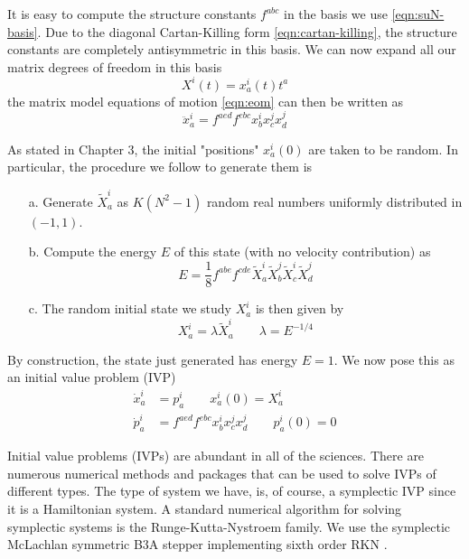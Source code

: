 It is easy to compute the structure constants $f^{a b c}$ in the basis we use \cref{eqn:suN-basis}. Due to the diagonal Cartan-Killing form \cref{eqn:cartan-killing}, the structure constants are completely antisymmetric in this basis. We can now expand all our matrix degrees of freedom in this basis
\begin{equation}
X^i(t) = x^{i}_{a}(t) t^a
\end{equation}
the matrix model equations of motion \cref{eqn:eom} can then be written as
\begin{equation}
\ddot{x}^i_a = f^{a e d} f^{e b c} x^i_b x^j_c x^j_d
\end{equation}

As stated in Chapter 3, the initial "positions" $x^i_a(0)$ are taken to be random. In particular, the procedure we follow to generate them is
\begin{enumerate}
  \item[a.] Generate $\tilde{X}^{i}_{a}$ as $K(N^2-1)$ random real numbers uniformly distributed in $(-1, 1)$.
  \item[b.] {
    Compute the energy $E$ of this state (with no velocity contribution) as%
    \begin{equation}
      E = \frac{1}{8} f^{a b e} f^{c d e} \tilde{X}^i_a \tilde{X}^j_b \tilde{X}^i_c \tilde{X}^j_d
    \end{equation}
  }
  \item[c.] {
    The random initial state we study $X^i_a$ is then given by
    \begin{equation}
      X^i_a = \lambda \tilde{X}^i_a \qquad \lambda = E^{-1/4}
    \end{equation}
  }
\end{enumerate}
By construction, the state just generated has energy $E = 1$. We now pose this as an initial value problem (IVP) 
\begin{align}
  \dot{x}^i_a &= p^i_a \qquad x^i_a(0) = X^i_a \\
  \dot{p}^i_a &= f^{a e d} f^{e b c} x^i_b x^j_c x^j_d \qquad p^i_a(0) = 0
\end{align}

Initial value problems (IVPs) are abundant in all of the sciences. There are numerous numerical methods and packages that can be used to solve IVPs of different types. The type of system we have, is, of course, a symplectic IVP since it is a Hamiltonian system. A standard numerical algorithm for solving symplectic systems is the Runge-Kutta-Nystroem family. We use the symplectic McLachlan symmetric B3A stepper implementing sixth order RKN \cite{doi:10.1137/0916010}. 


